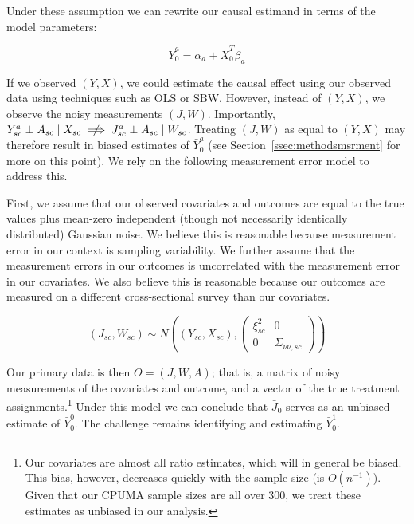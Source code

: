 \documentclass[aoas]{imsart}
\theoremstyle{plain}
\theoremstyle{remark}
\begin{document}
Under these assumption we can rewrite our causal estimand in terms of the model parameters:

\begin{equation}\label{eqn:outcome}
\bar{Y}_0^a = \alpha_a + \bar{X}_0^T\beta_a    
\end{equation}

If we observed $(Y, X)$, we could estimate the causal effect using our observed data using techniques such as OLS or SBW. However, instead of $(Y, X)$, we observe the noisy measurements $(J, W)$. Importantly, $Y_{sc}^a \perp A_{sc} \mid X_{sc} \centernot\implies J_{sc}^a \perp A_{sc} \mid W_{sc}$. Treating $(J, W)$ as equal to $(Y, X)$ may therefore result in biased estimates of $\bar{Y}_0^a$ (see Section~\ref{ssec:methodsmsrment} for more on this point). We rely on the following measurement error model to address this.

First, we assume that our observed covariates and outcomes are equal to the true values plus mean-zero independent (though not necessarily identically distributed) Gaussian noise. We believe this is reasonable because measurement error in our context is sampling variability. We further assume that the measurement errors in our outcomes is uncorrelated with the measurement error in our covariates. We also believe this is reasonable because our outcomes are measured on a different cross-sectional survey than our covariates. 

\begin{equation}\label{eqn:msrmenterror}
(J_{sc}, W_{sc}) \sim N((Y_{sc}, X_{sc}), \begin{pmatrix}
\xi^2_{sc} & 0 \\ 0 & \Sigma_{\nu\nu, sc} \end{pmatrix})
\end{equation}

Our primary data is then $O = (J, W, A)$; that is, a matrix of noisy measurements of the covariates and outcome, and a vector of the true treatment assignments.\footnote{Our covariates are almost all ratio estimates, which will in general be biased. This bias, however, decreases quickly with the sample size (is $O(n^{-1})$). Given that our CPUMA sample sizes are all over 300, we treat these estimates as unbiased in our analysis.} Under this model we can conclude that $\bar{J}_0$ serves as an unbiased estimate of $\bar{Y}_0^0$. The challenge remains identifying and estimating $\bar{Y}_0^1$.
\end{document}
